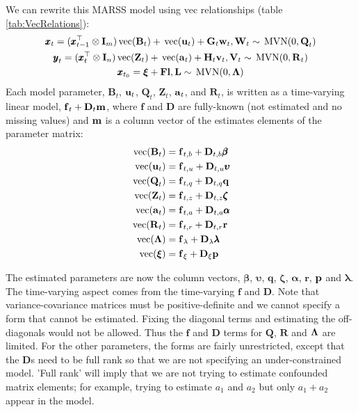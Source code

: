 \documentclass[]{article}
\def\uupsilon{\pmb{\upsilon}}
\def\llambda{\pmb{\lambda}}
\def\bbeta{\pmb{\beta}}
\def\aalpha{\pmb{\alpha}}
\def\zzeta{\pmb{\zeta}}
\def\xixi{\mbox{\boldmath $\xi$}}
\def\LAM{\mbox{\boldmath $\Lambda$}}
\def\UPS{\mbox{\boldmath $\Upsilon$}}
\def\XI{\mbox{\boldmath $\Xi$}}
\def\BB{\mbox{$\mathbf B$}}	\def\bb{\mbox{$\mathbf b$}} \def\Bb{\mbox{$\mathbf J$}} \def\Ba{\mbox{$\mathbf L$}} \def\Bm{\UPS}
\def\DD{\mbox{$\mathbf D$}}	\def\dd{\mbox{$\mathbf d$}}
\def\FF{\mbox{$\mathbf F$}} \def\ff{\mbox{$\mathbf f$}}
\def\GG{\mbox{$\mathbf G$}}	\def\gg{\mbox{$\mathbf g$}}
\def\HH{\mbox{$\mathbf H$}}	\def\hh{\mbox{$\mathbf h$}}
\def\II{\mbox{$\mathbf I$}} \def\ii{\mbox{$\mathbf i$}}
\def\LL{\mbox{$\mathbf L$}}	\def\ll{\mbox{$\mathbf l$}}
\def\MVN{\,\textup{\textrm{MVN}}}
\def\QQ{\mbox{$\mathbf Q$}}	 \def\qq{\mbox{$\mathbf q$}} \def\Qb{\mbox{$\mathbf G$}}  \def\Qm{\mathbb{Q}}
\def\RR{\mbox{$\mathbf R$}}	 \def\rr{\mbox{$\mathbf r$}} \def\Rb{\mbox{$\mathbf H$}}	\def\Rm{\mathbb{R}}
\def\VV{\mbox{$\mathbf V$}}	\def\vv{\mbox{$\mathbf v$}}
\def\WW{\mbox{$\mathbf W$}}	\def\ww{\mbox{$\mathbf w$}}
\def\ZZ{\mbox{$\mathbf Z$}}	\def\zz{\mbox{$\mathbf z$}}	\def\Zb{\mbox{$\mathbf M$}} \def\Za{\mbox{$\mathbf N$}} \def\Zm{\XI}
\def\vec{\,\textup{\textrm{vec}}}
\begin{document}
We can rewrite this MARSS model using vec relationships (table \ref{tab:VecRelations}):
\begin{equation}\label{eq:MARSS.ex.vec}
\begin{gathered}
\xx_t = (\xx_{t-1}^\top \otimes \II_m)\vec(\BB_t) + \vec(\uu_t) + \GG_t\ww_t, \WW_t  \sim \MVN(0,\QQ_t)\\
\yy_t = (\xx_t^\top \otimes \II_n)\vec(\ZZ_t) + \vec(\aa_t) + \HH_t\vv_t, \VV_t \sim \MVN(0,\RR_t)\\
\xx_{t_0} = \xixi+\FF\ll, \LL \sim \MVN(0,\LAM)
\end{gathered}
\end{equation}
Each model parameter, $\BB_t$, $\uu_t$, $\QQ_t$, $\ZZ_t$, $\aa_t$, and $\RR_t$, is written as a time-varying linear model, $\ff_t+\DD_t\mm$, where $\ff$ and $\DD$ are fully-known (not estimated and no missing values) and $\mm$ is a column vector of the estimates elements of the parameter matrix:
\begin{equation}\label{eq:MARSS.ex.vec.2}
\begin{split}
\vec(\BB_t) &= \ff_{t,b} + \DD_{t,b}\bbeta\\
\vec(\uu_t) &= \ff_{t,u} + \DD_{t,u}\uupsilon\\
\vec(\QQ_t) &= \ff_{t,q} + \DD_{t,q}\qq\\
\vec(\ZZ_t) &= \ff_{t,z} + \DD_{t,z}\zzeta\\
\vec(\aa_t) &= \ff_{t,a} + \DD_{t,a}\aalpha\\
\vec(\RR_t) &= \ff_{t,r} + \DD_{t,r}\rr\\
\vec(\LAM)&= \ff_\lambda+\DD_\lambda\llambda \\
\vec(\xixi)&= \ff_\xi+\DD_\xi\pp
\end{split}
\end{equation}

The estimated parameters are now the column vectors, $\bbeta$, $\uupsilon$, $\qq$, $\zzeta$, $\aalpha$, $\rr$, $\pp$ and $\llambda$.  The time-varying aspect comes from the time-varying $\ff$ and $\DD$.  Note that variance-covariance matrices must be positive-definite and we cannot specify a form that cannot be estimated.  Fixing the diagonal terms and estimating the off-diagonals would not be allowed.  Thus the $\ff$ and $\DD$ terms for $\QQ$, $\RR$ and $\LAM$ are limited.  For the other parameters, the forms are fairly unrestricted, except that the $\DD$s need to be full rank so that we are not specifying an under-constrained model.  'Full rank' will imply that we are not trying to estimate confounded matrix elements; for example, trying to estimate $a_1$ and $a_2$ but only $a_1+a_2$ appear in the model.
\end{document}
